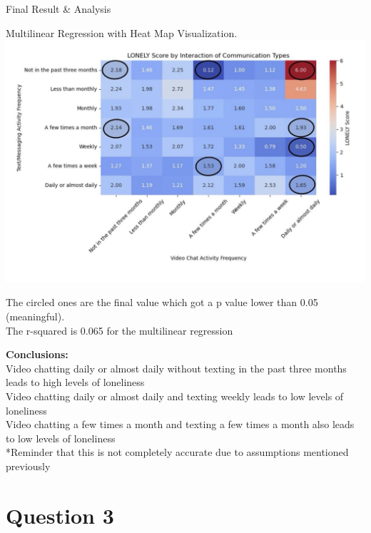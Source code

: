 \documentclass{beamer}
\begin{document}
\begin{frame}{Final Result & Analysis}


Multilinear Regression with Heat Map Visualization.\\
\includegraphics[width=0.5\linewidth]{image4.png}


The circled ones are the final value which got a p value lower than 0.05 (meaningful).\\
The r-squared is 0.065 for the multilinear regression\\
\end{frame}

\begin{frame}
\textbf{Conclusions:}\\
Video chatting daily or almost daily without texting in the past three months leads to high levels of loneliness\\
Video chatting daily or almost daily and texting weekly leads to low levels of loneliness\\
Video chatting a few times a month and texting a few times a month also leads to low levels of loneliness\\

*Reminder that this is not completely accurate due to assumptions mentioned previously\\
\end{frame}

\section{Question 3}
\end{document}
